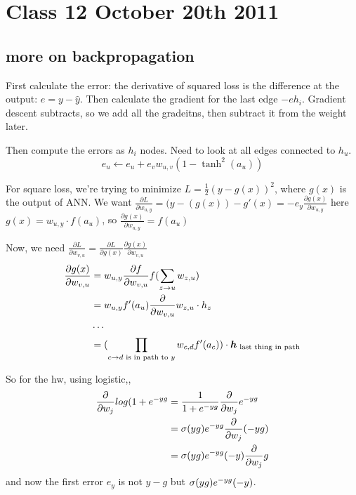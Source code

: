 \pagebreak

\section{Class 12 October 20th 2011}
\label{sec:class12}

\subsection{more on backpropagation}
\label{sec:backprop}
First calculate the error: the derivative of squared loss is the difference at
the output: $e = y-\hat y$.
Then calculate the gradient for the last edge $-eh_i$. Gradient
descent subtracts, so we add all the gradeitns, then subtract it from
the weight later.

Then compute the errors as $h_i$ nodes. Need to look at all edges
connected to $h_u$.
$$e_u\leftarrow e_u+ e_vw_{u,v}(1-\tanh^2(a_u))$$

For square loss, we're trying to minimize $L=\frac{1}{2}(y-g(x))^2$, where $g(x)$ is the
output of ANN. We want $\frac{\partial L}{\partial w_{u,y}} =
(y-(g(x))-g'(x) = -e_y\frac{\partial g(x)}{\partial w_{u,y}}$
here $g(x) = w_{u,y}\cdot f(a_u)$, so $\frac{\partial g(x)}{\partial
  w_{u,y}} = f(a_u)$

Now, we need $\frac{\partial L}{\partial w_{v,u}} =\frac{\partial
  L}{\partial g(x)} \frac{\partial g(x)}{\partial w_{v,u}}$
\begin{align*}
\frac{\partial g(x)}{\partial w_{v,u}} &= w_{u,y}\frac{\partial
  f}{\partial w_{v,u}}f(\sum_{z\rightarrow u}w_{z,u})\\
&=  w_{u,y}f'(a_u)\frac{\partial}{\partial w_{v,u}}w_{z,u}\cdot h_z\\
&\cdots\\
&= (\prod_{c\rightarrow d \text{ is in path to }y}w_{c,d}f'(a_c))\cdot \boldsymbol{h}_{\text{ last thing in path}}
\end{align*}

So for the hw, using logistic,,
\begin{align*}
  \frac{\partial}{\partial w_j}log(1+e^{-yg}&=
  \frac{1}{1+e^{-yg}}\frac{\partial}{\partial w_j}e^{-yg}\\
&=\sigma(yg)e^{-yg}\frac{\partial}{\partial w_j}(-yg)\\
&=\sigma(yg)e^{-yg}(-y)\frac{\partial}{\partial w_j}g\\
\end{align*}
and now the first error $e_y$ is not $y-g$ but $\sigma(yg)e^{-yg}(-y)$.

